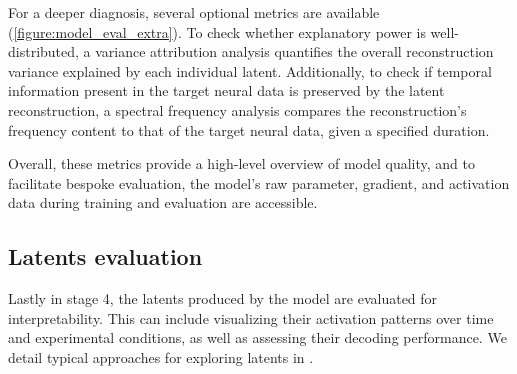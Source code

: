 For a deeper diagnosis, several optional metrics are available (\autoref{figure:model_eval_extra}). To check whether explanatory power is well-distributed, a variance attribution analysis quantifies the overall reconstruction variance explained by each individual latent. Additionally, to check if temporal information present in the target neural data is preserved by the latent reconstruction, a spectral frequency analysis compares the reconstruction's frequency content to that of the target neural data, given a specified duration.

Overall, these metrics provide a high-level overview of model quality, and to facilitate bespoke evaluation, the model's raw parameter, gradient, and activation data during training and evaluation are accessible.

\subsection{Latents evaluation}

Lastly in stage 4, the latents produced by the model are evaluated for interpretability. This can include visualizing their activation patterns over time and experimental conditions, as well as assessing their decoding performance. We detail typical approaches for exploring latents in .
